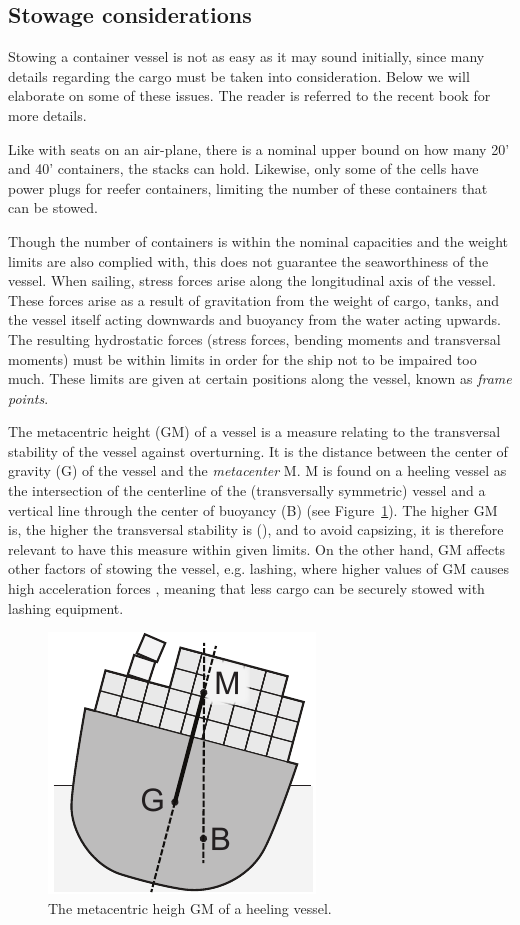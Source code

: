 \subsection{Stowage considerations}
Stowing a container vessel is not as easy as it may sound initially, since many details regarding the cargo must be taken into consideration.
Below we will elaborate on some of these issues. The reader is referred to the recent book \cite{JPAV18} for more details.

Like with seats on an air-plane, there is a nominal upper bound on how many 20' and 40' containers, the stacks can hold. Likewise, only some of the cells have power plugs for reefer containers, limiting the number of these containers that can be stowed. 

Though the number of containers is within the nominal capacities and the weight limits are also complied with, this does not guarantee the  seaworthiness of the vessel. When sailing, stress forces arise along the longitudinal axis of the vessel. These forces arise as a result of gravitation from the weight of cargo, tanks, and the vessel itself acting downwards and buoyancy from the water acting upwards. The resulting hydrostatic forces (stress forces, bending moments and transversal moments) must be within limits in order for the ship not to be impaired too much. These limits are given at certain positions along the vessel, known as \emph{frame points}. 

The metacentric height (GM) of a vessel is a measure relating to the transversal stability of the vessel against overturning. It is the distance between the center of gravity (G) of the vessel and the \emph{metacenter} M. M is found on a heeling vessel as the intersection of the centerline of the (transversally symmetric) vessel and a vertical line through the center of buoyancy (B) (see Figure~\ref{fig:GMA}). The higher GM is, the higher the transversal stability is (\cite{JPAV18}), and to avoid capsizing, it is therefore relevant to have this measure within given limits. 
On the other hand, GM affects other factors of stowing the vessel, e.g. lashing, where {higher} values of GM causes high acceleration forces , meaning that less cargo can be securely stowed with lashing equipment. 

\begin{figure}
	\centering
		\includegraphics[scale=0.7]{figures/GM.pdf}
	\caption{The metacentric heigh GM of a heeling vessel.}
	\label{fig:GMA}
\end{figure}

